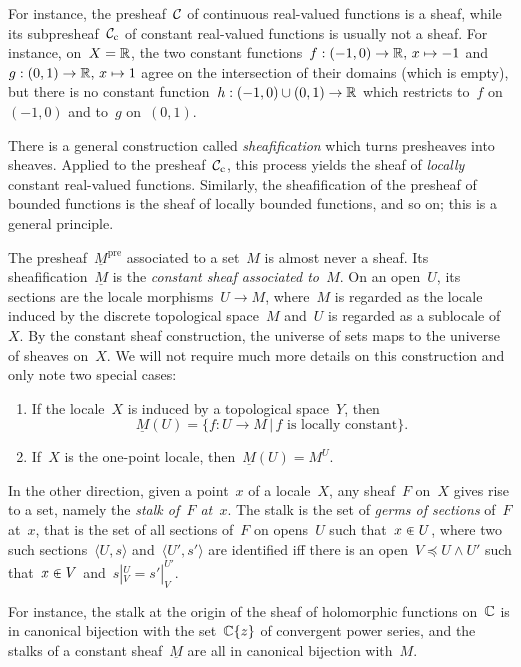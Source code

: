 \documentclass{ws-rv9x6}
\begin{document}
{For instance, the presheaf~$\mathcal{C}$ of continuous real-valued functions is a sheaf,
while its subpresheaf~$\mathcal{C}_\text{c}$ of constant real-valued functions is
usually not a sheaf. For instance, on~$X = \mathbb{R}$, the two constant functions~$f
: (-1,0) \to \mathbb{R},\,x \mapsto -1$ and~$g : (0,1) \to \mathbb{R},\,x \mapsto 1$ agree on
the intersection of their domains (which is empty), but there is no constant
function~$h : (-1,0) \cup (0,1) \to \mathbb{R}$ which restricts to~$f$ on~$(-1,0)$ and
to~$g$ on~$(0,1)$.

There is a general construction called \emph{sheafification} which turns
presheaves into sheaves. Applied to the presheaf~$\mathcal{C}_\text{c}$, this process yields the
sheaf of \emph{locally} constant real-valued functions. Similarly, the
sheafification of the presheaf of bounded functions is the sheaf of locally
bounded functions, and so on; this is a general principle.

\label{par:constant-sheaf}%
The presheaf~$\underline{M}^\mathrm{pre}$ associated to a set~$M$ is almost
never a sheaf. Its sheafification~$\underline{M}$ is the \emph{constant sheaf associated
to~$M$}\label{page:constant-sheaf}. On an open~$U$, its sections are the locale
morphisms~$U \to M$, where~$M$ is regarded as the locale induced by
the discrete topological space~$M$ and~$U$ is regarded as a sublocale of~$X$.
By the constant sheaf construction, the universe of sets maps to the universe
of sheaves on~$X$. We will not require much more details on this construction
and only note two special cases:
\begin{enumerate}
\item If the locale~$X$ is induced by a topological space~$Y$, then
\[ \underline{M}(U) = \{ f : U \to M \,|\, \text{$f$ is locally constant} \}. \]
\item If~$X$ is the one-point locale, then~$\underline{M}(U) = M^U$.
\end{enumerate}

In the other direction, given a point~$x$ of a locale~$X$, any sheaf~$F$ on~$X$ gives
rise to a set, namely the \emph{stalk of~$F$ at~$x$}. The stalk is the set of
\emph{germs of sections} of~$F$ at~$x$, that is the set of all sections of~$F$
on opens~$U$ such that~$x \inplus U$, where two such sections~$\langle U,s
\rangle$ and~$\langle U',s' \rangle$ are identified iff there is an open~$V
\preceq U \wedge U'$ such that~$x \inplus V$ and~$s|^U_V = s'|^{U'}_V$.

For instance, the stalk at the origin of the sheaf of holomorphic functions
on~$\mathbb{C}$ is in canonical bijection with the set~$\mathbb{C}\{z\}$ of convergent power
series, and the stalks of a constant sheaf~$\underline{M}$ are all in canonical
bijection with~$M$.

}
\end{document}
